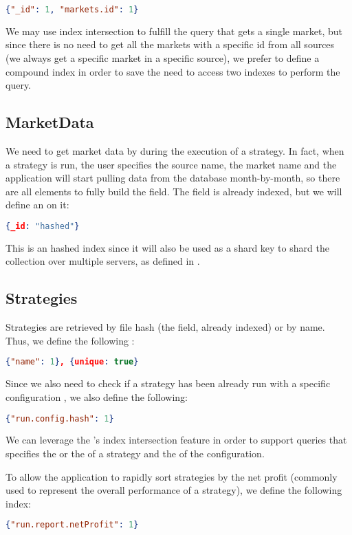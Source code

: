 \begin{lstlisting}[language=json]
{"_id": 1, "markets.id": 1}
\end{lstlisting}

We may use index intersection to fulfill the query that gets a single market,
but since there is no need to get all the markets with a specific id from all
sources (we always get a specific market in a specific source), we prefer to
define a compound index in order to save \mongodb{} the need to access two indexes
to perform the query.

\subsection{MarketData}

We need to get market data by  during the execution of a strategy. In
fact, when a strategy is run, the user specifies the source name, the market
name and the application will start pulling data from the database
month-by-month, so there are all elements to fully build the  field.
The  field is already indexed, but we will define an  on it:

\begin{lstlisting}[language=json]
{_id: "hashed"}
\end{lstlisting}

This is an hashed index since it will also be used as a shard key to shard the
collection over multiple servers, as defined in .

\subsection{Strategies}

Strategies are retrieved by file hash (the  field, already indexed)
or by name. Thus, we define the following :

\begin{lstlisting}[language=json]
{"name": 1}, {unique: true}
\end{lstlisting}

Since we also need to check if a strategy has been already run with a specific
configuration , we also define the
following:

\begin{lstlisting}[language=json]
{"run.config.hash": 1}
\end{lstlisting}

We can leverage the \mongodb's index intersection feature in order to support
queries that specifies the  or the  of a strategy and the
 of the configuration.

To allow the application to rapidly sort strategies by the net profit (commonly
used to represent the overall performance of a strategy), we define the
following index:

\begin{lstlisting}[language=json]
{"run.report.netProfit": 1}
\end{lstlisting}
